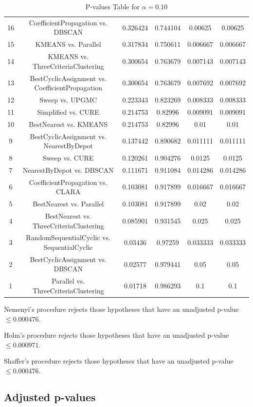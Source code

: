\documentclass[a4paper,10pt]{article}
\begin{document}
\begin{landscape}
\begin{table}[!htp]
\begin{tabular}{cccccc}
16&CoefficientPropagation vs. DBSCAN&0.326424&0.744104&0.00625&0.00625\\
15&KMEANS vs. Parallel&0.317834&0.750611&0.006667&0.006667\\
14&KMEANS vs. ThreeCriteriaClustering&0.300654&0.763679&0.007143&0.007143\\
13&BestCyclicAssignment vs. CoefficientPropagation&0.300654&0.763679&0.007692&0.007692\\
12&Sweep vs. UPGMC&0.223343&0.823269&0.008333&0.008333\\
11&Simplified vs. CURE&0.214753&0.82996&0.009091&0.009091\\
10&BestNearest vs. KMEANS&0.214753&0.82996&0.01&0.01\\
9&BestCyclicAssignment vs. NearestByDepot&0.137442&0.890682&0.011111&0.011111\\
8&Sweep vs. CURE&0.120261&0.904276&0.0125&0.0125\\
7&NearestByDepot vs. DBSCAN&0.111671&0.911084&0.014286&0.014286\\
6&CoefficientPropagation vs. CLARA&0.103081&0.917899&0.016667&0.016667\\
5&BestNearest vs. Parallel&0.103081&0.917899&0.02&0.02\\
4&BestNearest vs. ThreeCriteriaClustering&0.085901&0.931545&0.025&0.025\\
3&RandomSequentialCyclic vs. SequentialCyclic&0.03436&0.97259&0.033333&0.033333\\
2&BestCyclicAssignment vs. DBSCAN&0.02577&0.979441&0.05&0.05\\
1&Parallel vs. ThreeCriteriaClustering&0.01718&0.986293&0.1&0.1\\
\hline
\end{tabular}
\caption{P-values Table for $\alpha=0.10$}
\end{table}Nemenyi's procedure rejects those hypotheses that have an unadjusted p-value $\le0.000476$.

Holm's procedure rejects those hypotheses that have an unadjusted p-value $\le0.000971$.

Shaffer's procedure rejects those hypotheses that have an unadjusted p-value $\le0.000476$.

\pagebreak

\subsection{Adjusted p-values}


\end{landscape}
\end{document}
